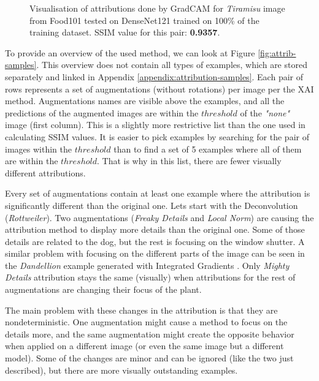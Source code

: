\begin{figure}
 \caption{Visualisation of attributions done by GradCAM \cite{selvaraju2017grad} for \textit{Tiramisu} image from Food101 \cite{food101} tested on DenseNet121 \cite{huang2017densely} trained on 100\% of the training dataset. SSIM value for this pair: \textbf{0.9357}.}\label{fig:xai-tiramisu}
 \vspace{-38pt}
\end{figure}

\vspace{\baselineskip}

To provide an overview of the used method, we can look at Figure \ref{fig:attrib-samples}. This overview does not contain all types of examples, which are stored separately and linked in Appendix \ref{appendix:attribution-samples}. Each pair of rows represents a set of augmentations (without rotations) per image per the XAI method. Augmentations names are visible above the examples, and all the predictions of the augmented images are within the $threshold$ of the \textit{"none"} image (first column). This is a slightly more restrictive list than the one used in calculating SSIM values. It is easier to pick examples by searching for the pair of images within the $threshold$ than to find a set of 5 examples where all of them are within the $threshold$. That is why in this list, there are fewer visually different attributions.

\vspace{\baselineskip}

Every set of augmentations contain at least one example where the attribution is significantly different than the original one. Lets start with the Deconvolution (\textit{Rottweiler}). Two augmentations (\textit{Freaky Details} and \textit{Local Norm}) are causing the attribution method to display more details than the original one. Some of those details are related to the dog, but the rest is focusing on the window shutter. A similar problem with focusing on the different parts of the image can be seen in the \textit{Dandellion} example generated with Integrated Gradients \cite{sundararajan2017axiomatic}. Only \textit{Mighty Details} attribution stays the same (visually) when attributions for the rest of augmentations are changing their focus of the plant.

\vspace{\baselineskip}

The main problem with these changes in the attribution is that they are nondeterministic. One augmentation might cause a method to focus on the details more, and the same augmentation might create the opposite behavior when applied on a different image (or even the same image but a different model). Some of the changes are minor and can be ignored (like the two just described), but there are more visually outstanding examples.


